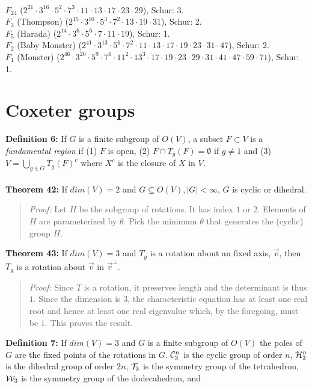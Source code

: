 \\
$F_{24}$ ($2^{21} \cdot 3^{16} \cdot 5^2 \cdot 7^3 \cdot 11 \cdot 13 \cdot 17 \cdot 23 \cdot 29$), Schur: 3.
\\
$F_3$ (Thompson) ($2^{15} \cdot 3^{10} \cdot 5^3 \cdot 7^2 \cdot 13 \cdot 19 \cdot 31$), Schur: 2.
\\
$F_5$ (Harada) ($2^{14} \cdot 3^{6} \cdot 5^6 \cdot 7 \cdot 11 \cdot 19$), Schur: 1.
\\
$F_2$ (Baby Monster) ($2^{41} \cdot 3^{13} \cdot 5^6 \cdot 7^2 \cdot 11 \cdot 13 
\cdot 17 \cdot 19 \cdot 23 \cdot 31 \cdot 47$), Schur: 2.
\\
$F_1$ (Monster) ($2^{46} \cdot 3^{20} \cdot 5^9 \cdot 7^6 
\cdot 11^2 \cdot 13^3 \cdot 17 \cdot 19 \cdot 23 \cdot 29 \cdot 31 \cdot 41 \cdot 47 \cdot 
59 \cdot 71$), Schur: 1.
\section{Coxeter groups}
{\bf Definition 6:}  If $G$ is a finite subgroup of $O(V)$, a subset $F \subset V$ 
is a \emph{fundamental region} if (1) $F$ is open, (2) $F \cap T_g(F) = \emptyset$
if $g \ne 1$ and (3) $V= \bigcup_{g \in G} T_g(F)^c$ where $X^c$ is the closure of
$X$ in $V$.
\\
\\
{\bf Theorem 42:}  If $dim(V)=2$ and $G \subseteq O(V), |G|< \infty$,
$G$ is cyclic or dihedral.
\begin{quote}
\emph{Proof:}  
Let $H$ be the subgroup of rotations.  It has index $1$ or $2$.  Elements of $H$ are parameterized
by $\theta$.  Pick the minimum $\theta$ that generates the (cyclic) group $H$.
\end{quote}
{\bf Theorem 43:}  If $dim(V)=3$ and $T_g$ is a rotation about an fixed axis, ${\vec v}$, then
$T_g$ is a rotation about ${\vec v}$ in ${\vec v}^{\perp}$.
\begin{quote}
\emph{Proof:}  
Since $T$ is a rotation, it preserves length and the determinant is thus $1$.  
Since the dimension is $3$, the characteristic equation has at least one real root and
hence at least one real eigenvalue which, by the foregoing, must be $1$.  This proves the result.
\end{quote}
{\bf Definition 7:}  If $dim(V)=3$ and $G$ is a finite subgroup of $O(V)$ the poles of $G$ are
the fixed points of the rotations in $G$. 
${\cal C}_3^n$ is the cyclic group of order $n$,
${\cal H}_3^n$ is the dihedral group of order $2n$,
${\cal T}_3$ is the symmetry group of the tetrahedron,
${\cal W}_3$ is the symmetry group of the dodecahedron, and
